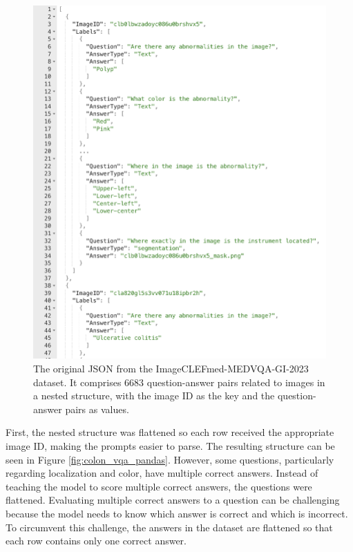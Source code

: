         \begin{figure}[htb]
            \centering
            \centerline{
            \includegraphics[width=1.2\textwidth]{images/colon_vqa_original_json.png}}
            \caption{The original JSON from the ImageCLEFmed-MEDVQA-GI-2023 dataset. It comprises 6683 question-answer pairs related to images in a nested structure, with the image ID as the key and the question-answer pairs as values.}
            \label{fig:colon_vqa_original_json}
        \end{figure}


        First, the nested structure was flattened so each row received the appropriate image ID, making the prompts easier to parse. The resulting structure can be seen in Figure \ref{fig:colon_vqa_pandas}. However, some questions, particularly regarding localization and color, have multiple correct answers. Instead of teaching the model to score multiple correct answers, the questions were flattened. Evaluating multiple correct answers to a question can be challenging because the model needs to know which answer is correct and which is incorrect. To circumvent this challenge, the answers in the dataset are flattened so that each row contains only one correct answer.

